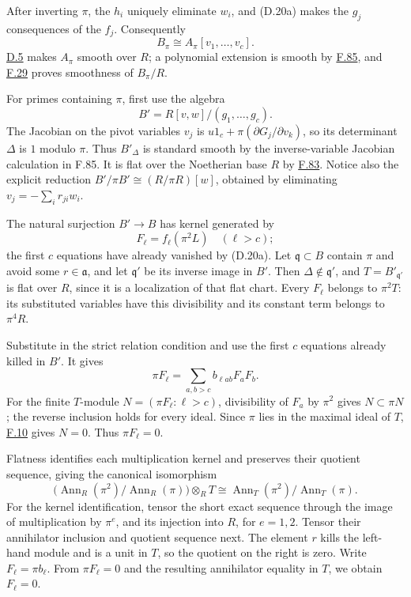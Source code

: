 \documentclass[11pt,a4paper,openany]{report}
\begin{document}
After inverting \(\pi\), the \(h_i\) uniquely eliminate \(w_i\), and (D.20a) makes the \(g_j\) consequences of the \(f_j\). Consequently \[
B_\pi\cong A_\pi[v_1,\ldots,v_c].
\] \hyperref[AG-RG-S05-smoothing-lemma-elkik]{D.5} makes \(A_\pi\) smooth over \(R\); a polynomial extension is smooth by \hyperref[AG-RG-S05-algebra-lemma-standard-smooth]{F.85}, and \hyperref[AG-RG-S05-algebra-lemma-compose-smooth]{F.29} proves smoothness of \(B_\pi/R\).

For primes containing \(\pi\), first use the algebra \[
B'=R[v,w]/(g_1,\ldots,g_c).
\] The Jacobian on the pivot variables \(v_j\) is \(u1_c+\pi(\partial G_j/\partial v_k)\), so its determinant \(\Delta\) is \(1\) modulo \(\pi\). Thus \(B'_\Delta\) is standard smooth by the inverse-variable Jacobian calculation in F.85. It is flat over the Noetherian base \(R\) by \hyperref[AG-RG-S05-algebra-lemma-smooth-syntomic]{F.83}. Notice also the explicit reduction \(B'/\pi B'\cong(R/\pi R)[w]\), obtained by eliminating \(v_j=-\sum_i r_{ji}w_i\).

The natural surjection \(B'\to B\) has kernel generated by \[
F_\ell=f_\ell(\pi^2L)\quad(\ell>c);
\] the first \(c\) equations have already vanished by (D.20a). Let \(\mathfrak q\subset B\) contain \(\pi\) and avoid some \(r\in\mathfrak a\), and let \(\mathfrak q'\) be its inverse image in \(B'\). Then \(\Delta\notin\mathfrak q'\), and \(T=B'_{\mathfrak q'}\) is flat over \(R\), since it is a localization of that flat chart. Every \(F_\ell\) belongs to \(\pi^2T\): its substituted variables have this divisibility and its constant term belongs to \(\pi^4R\).

Substitute in the strict relation condition and use the first \(c\) equations already killed in \(B'\). It gives \[
\pi F_\ell=\sum_{a,b>c}b_{\ell ab}F_aF_b.
\] For the finite \(T\)-module \(N=(\pi F_\ell:\ell>c)\), divisibility of \(F_a\) by \(\pi^2\) gives \(N\subset\pi N\); the reverse inclusion holds for every ideal. Since \(\pi\) lies in the maximal ideal of \(T\), \hyperref[AG-RG-S05-algebra-lemma-NAK]{F.10} gives \(N=0\). Thus \(\pi F_\ell=0\).

Flatness identifies each multiplication kernel and preserves their quotient sequence, giving the canonical isomorphism \[
\bigl(\operatorname{Ann}_R(\pi^2)/\operatorname{Ann}_R(\pi)\bigr)
\otimes_RT
\cong
\operatorname{Ann}_T(\pi^2)/\operatorname{Ann}_T(\pi).
\] For the kernel identification, tensor the short exact sequence through the image of multiplication by \(\pi^e\), and its injection into \(R\), for \(e=1,2\). Tensor their annihilator inclusion and quotient sequence next. The element \(r\) kills the left-hand module and is a unit in \(T\), so the quotient on the right is zero. Write \(F_\ell=\pi b_\ell\). From \(\pi F_\ell=0\) and the resulting annihilator equality in \(T\), we obtain \(F_\ell=0\).
\end{document}
